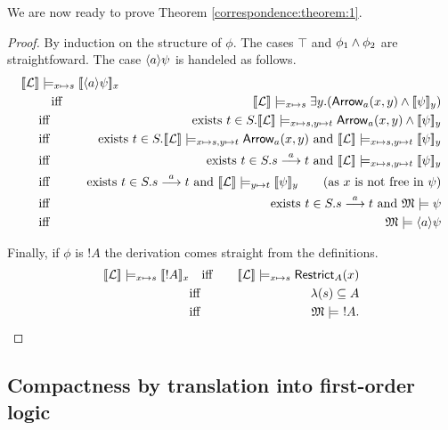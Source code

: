\NI We are now ready to prove Theorem \ref{correspondence:theorem:1}.
\begin{proof}
By induction on the structure of $\phi$. The cases $\top$ and $\phi_1
\land \phi_2$ are straightfoward.  The case $\langle a \rangle \psi$ is handeled
as follows.
\begin{eqnarray*}
  \lefteqn{
  \SEMB{\LLL} \models_{x \mapsto s} \SEMB{\MAY{a}\psi}_x}\hspace{5mm} 
     \\
     &\quad \text{iff}\quad &
  \SEMB{\LLL} \models_{x \mapsto s} \exists y.(\ARROW{a}{x}{y} \AND \SEMB{\psi}_y) 
     \\
     &\text{iff}&
  \text{exists}\ t \in S. \SEMB{\LLL} \models_{x \mapsto s, y \mapsto t} \ARROW{a}{x}{y} \AND \SEMB{\psi}_y
     \\
     &\text{iff}&
  \text{exists}\ t \in S. \SEMB{\LLL} \models_{x \mapsto s, y \mapsto t} \ARROW{a}{x}{y} \ \text{and}\ \SEMB{\LLL} \models_{x \mapsto s, y \mapsto t}  \SEMB{\psi}_y
     \\
     &\text{iff}&
  \text{exists}\ t \in S. s \TRANS{a} t \ \text{and}\ \SEMB{\LLL} \models_{x \mapsto s, y \mapsto t}  \SEMB{\psi}_y
     \\
     &\text{iff}&
  \text{exists}\ t \in S. s \TRANS{a} t \ \text{and}\ \SEMB{\LLL} \models_{y \mapsto t}  \SEMB{\psi}_y \qquad (\text{as $x$ is not free in $\psi$})
     \\
     &\text{iff}&
  \text{exists}\ t \in S. s \TRANS{a} t \ \text{and}\ \MMM \models \psi
     \\
     &\text{iff}&
  \MMM \models \MAY{a}\psi  
\end{eqnarray*}

\NI Finally, if $\phi$ is $!A$ the derivation comes straight from the
definitions.
\begin{eqnarray*}
  \lbrack\!\lbrack \mathcal{L} \rbrack\!\rbrack \models_{x \mapsto s} \lbrack\!\lbrack !A \rbrack\!\rbrack_x
    &\quad \text{iff}\quad &
  \lbrack\!\lbrack \mathcal{L} \rbrack\!\rbrack \models_{x \mapsto s} \mathsf{Restrict}_{A}(x)
     \\
     &\text{iff}&
  \lambda(s) \subseteq A
     \\
     &\text{iff}&
  \frak{M} \models\ !A.
\end{eqnarray*}
\end{proof}

\subsection{Compactness by translation into first-order logic}\label{compactnessProof}

